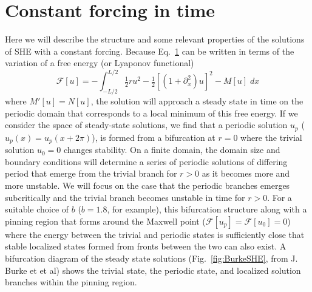 \documentclass[../main/TimeForcingSHE.tex]{subfiles}
\begin{document}
\section{Constant forcing in time }

Here we will describe the structure and some relevant properties of the  solutions of SHE with a constant forcing.   Because Eq.~\ref{} can be written in terms of the variation of a free energy (or Lyaponov functional)
\begin{equation}
\mathcal{F}[u]=-\int_{-L/2}^{L/2}\tfrac{1}{2}r u^2-\tfrac{1}{2}\left[(1+\partial_x^2)u\right]^2-M[u] \;dx
\end{equation}
where $M'[u]=N[u]$, the solution will approach a steady state in time on the periodic domain that corresponds to a local minimum of this free energy.  If we consider the space of steady-state solutions, we find that a periodic solution $u_p$ ($u_p(x)=u_p(x+2\pi)$), is formed from a bifurcation at $r=0$ where the trivial solution $u_0=0$ changes stability.  On a finite domain, the domain size and boundary conditions will determine a series of periodic solutions of differing period that emerge from the trivial branch for $r>0$ as it becomes more and more unstable.   We will focus on the case that the periodic branches  emerges subcritically and the trivial branch becomes unstable in time for $r>0$.  For a suitable choice of $b$ ($b=1.8$, for example), this bifurcation structure along with a pinning region that forms around the Maxwell point ($\mathcal{F}[u_p]=\mathcal{F}[u_0]=0$) where the energy between the trivial and periodic states is sufficiently close that stable localized states formed from fronts between the two can also exist.  A bifurcation diagram of the steady state solutions (Fig.~\ref{fig:BurkeSHE}, from J. Burke et et al) shows the trivial state, the periodic state, and localized solution branches within the pinning region.  

\FIGshesnaking
\end{document}
